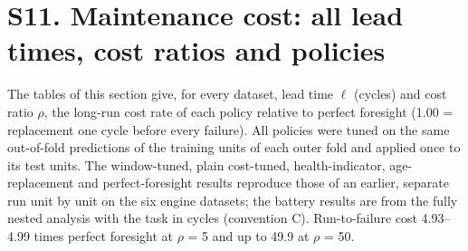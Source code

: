 \documentclass[11pt,a4paper]{article}
\begin{document}
\section*{S11. Maintenance cost: all lead times, cost ratios and policies}

\noindent The tables of this section give, for every dataset, lead time $\ell$ (cycles) and cost ratio $\rho$, the long-run cost rate of each policy relative to perfect foresight (1.00 = replacement one cycle before every failure). All policies were tuned on the same out-of-fold predictions of the training units of each outer fold and applied once to its test units. The window-tuned, plain cost-tuned, health-indicator, age-replacement and perfect-foresight results reproduce those of an earlier, separate run unit by unit on the six engine datasets; the battery results are from the fully nested analysis with the task in cycles (convention C). Run-to-failure cost 4.93--4.99 times perfect foresight at $\rho$ = 5 and up to 49.9 at $\rho$ = 50.
\end{document}
